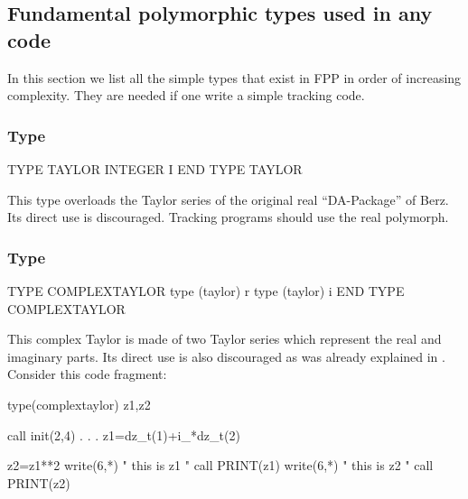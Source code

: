 \documentclass[english,12pt,article]{article} %
\begin{document}
\subsection{Fundamental polymorphic types used in any code}\label{sec:funtype}

In this section we list all the simple types that exist in FPP in order of increasing complexity. They are needed if one write a simple tracking code.

\subsubsection{Type  \protect{}}

\begin{example}
  TYPE TAYLOR
     INTEGER I   
  END TYPE TAYLOR
\end{example}

This type overloads the Taylor series of the original real ``DA-Package'' of Berz. Its direct use is discouraged. Tracking programs should use the real polymorph.

\subsubsection{Type \protect{}}\label{sec:complextaylor}

\begin{example}
  TYPE COMPLEXTAYLOR
     type (taylor) r
     type (taylor) i
  END TYPE COMPLEXTAYLOR
\end{example}

This complex Taylor is made of two Taylor series which represent the real and imaginary parts. Its direct use is also  discouraged as was already explained in  .  Consider this code fragment:



\begin{code}
    type(complextaylor) z1,z2
 
    call init(2,4)
    .
    .
    .
    z1=dz_t(1)+i_*dz_t(2)

    z2=z1**2
   write(6,*) " this is z1 "
   call PRINT(z1)   
   write(6,*) " this is z2 "
   call PRINT(z2)	
\end{code}
\end{document}
